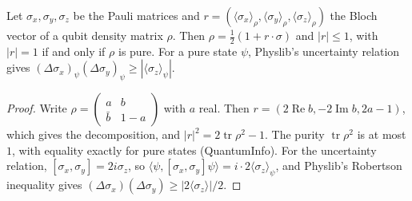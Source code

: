 \begin{theorem}[A qubit]\label{thm:qubit}
  \leanok
  Let $\sigma_x,\sigma_y,\sigma_z$ be the Pauli matrices and $r=(\langle\sigma_x\rangle_\rho,\langle\sigma_y\rangle_\rho,\langle\sigma_z\rangle_\rho)$
  the Bloch vector of a qubit density matrix $\rho$. Then $\rho=\tfrac12(1+r\cdot\sigma)$ and $|r|\le1$, with $|r|=1$ if and only if
  $\rho$ is pure. For a pure state $\psi$, Physlib's uncertainty relation gives
  $(\Delta\sigma_x)_\psi(\Delta\sigma_y)_\psi\ge|\langle\sigma_z\rangle_\psi|$.
\end{theorem}
\begin{proof}\leanok
  Write $\rho=\begin{pmatrix}a&b\\\bar b&1-a\end{pmatrix}$ with $a$ real. Then $r=(2\operatorname{Re}b,-2\operatorname{Im}b,2a-1)$,
  which gives the decomposition, and $|r|^2=2\operatorname{tr}\rho^2-1$. The purity $\operatorname{tr}\rho^2$ is at most $1$, with
  equality exactly for pure states (QuantumInfo). For the uncertainty relation, $[\sigma_x,\sigma_y]=2i\sigma_z$, so
  $\langle\psi,[\sigma_x,\sigma_y]\psi\rangle=i\cdot2\langle\sigma_z\rangle_\psi$, and Physlib's Robertson inequality gives
  $(\Delta\sigma_x)(\Delta\sigma_y)\ge|2\langle\sigma_z\rangle|/2$.
\end{proof}

